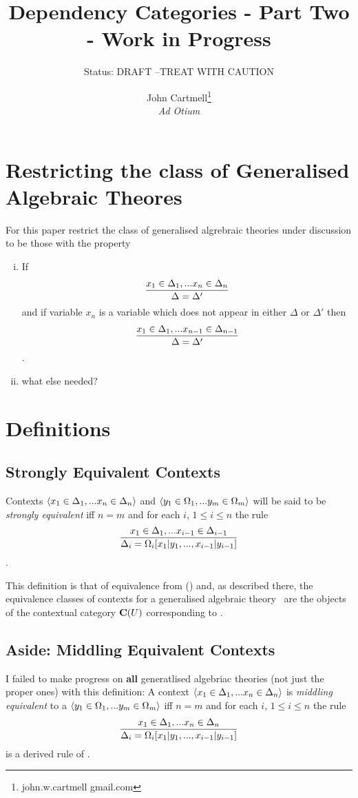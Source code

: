 \documentclass[10pt,a4paper]{scrartcl}
\title{Dependency Categories - Part Two - Work in Progress}
\author{John Cartmell\footnote{john.w.cartmell gmail.com}\\ \normalsize{\textit{Ad Otium}}}
\subtitle{Status: \normalsize{DRAFT --TREAT WITH CAUTION}}
\begin{document}
\maketitle

\section{Restricting the class of Generalised Algebraic Theores}
For this paper restrict the class of generalised algrebraic theories under 
discussion to be those with the property 
\begin{enumerate}[(i)]
\item 
If
$$
\frac{x_1 \in \Delta_1,... x_{n} \in \Delta_{n}}{\Delta=\Delta'}
$$
\intheory and if variable $x_n$ is a variable which does not appear in either
$\Delta$ or $\Delta'$ then
$$
\frac{x_1 \in \Delta_1,... x_{n-1} \in \Delta_{n-1}}{\Delta=\Delta'}
$$
\intheory.
\item
what else needed? 
\end{enumerate}
\section{Definitions}
\subsection{Strongly Equivalent Contexts}
\begin{definition}
Contexts $\langle x_1 \in \Delta_1,... x_{n} \in \Delta_{n}\rangle$ 
and $\langle y_1 \in \Omega_1,... y_{m} \in \Omega_{m}\rangle$ will be said to be \textit{strongly equivalent} iff $n=m$ and for each $i$, $1 \leq i \leq n$ the rule 
$$
\frac{x_1 \in \Delta_1,... x_{i-1} \in \Delta_{i-1}}{\Delta_i=\Omega_i[x_1|y_1,...,x_{i-1}|y_{i-1}]}
$$
\intheory.
\end{definition}

This definition is that of equivalence from (\cite{Cartmell78})  and, as described there, the  equivalence classes of contexts for a generalised algebraic theory \gat\  are the objects of the contextual category $\mathbf{C}(U)$ corresponding to \gat.

\subsection{Aside: Middling Equivalent Contexts}
I failed to make progress on \textbf{all} generatlised algebriac theories
(not just the proper ones) with this definition:
A context $\langle x_1 \in \Delta_1,... x_{n} \in \Delta_{n}\rangle$ 
is  \textit{middling equivalent}  to a $\langle y_1 \in \Omega_1,... y_{m} \in \Omega_{m}\rangle$ iff $n=m$ and for each $i$, $1 \leq i \leq n$ the rule 
$$
\frac{x_1 \in \Delta_1,... x_{n} \in \Delta_{n}}{\Delta_i=\Omega_i[x_1|y_1,...,x_{i-1}|y_{i-1}]}
$$
is a derived rule of \gat. \\
\end{document}

